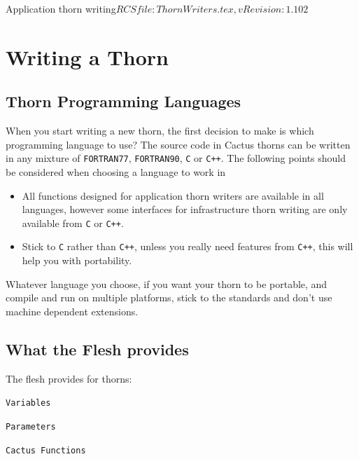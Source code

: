 \begin{cactuspart}{2}{Application thorn writing}{$RCSfile: ThornWriters.tex,v $}{$Revision: 1.102 $}

\chapter{Writing a Thorn}

\section{Thorn Programming Languages}

When you start writing a new thorn, the first decision to make is
which programming language to use? The source code in Cactus thorns
can be written in any mixture of {\tt FORTRAN77}, {\tt FORTRAN90},
{\tt C} or {\tt C++}. The following points should be considered when
choosing a language to work in
\begin{itemize}

\item All functions designed for application thorn writers are available
      in all languages, however some interfaces for infrastructure
      thorn writing are only available from {\tt C} or {\tt C++}.


\item Stick to {\tt C} rather than {\tt C++}, unless you really need
      features from {\tt C++}, this will help you with portability.

\end{itemize}

Whatever language you choose, if you want your thorn to be portable, and
compile and run on multiple platforms, stick to the standards and don't
use machine dependent extensions.


\section{What the Flesh provides}

The flesh provides for thorns:
\begin{Lentry}
\item [{\tt Variables}]
\item [{\tt Parameters}]
\item [{\tt Cactus Functions}]


\end{Lentry}
\end{cactuspart}
